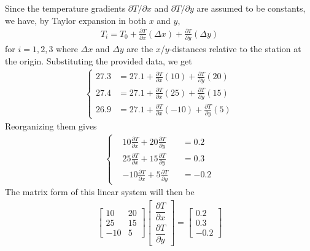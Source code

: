 \begin{solution}
Since the temperature gradients $\partial T/\partial x$ and $\partial T/\partial y$ are assumed to be constants, we have, by Taylor expansion in both $x$ and $y$,
\begin{align*}
T_i = T_0 + \frac{\partial T}{\partial x}(\Delta x) + \frac{\partial T}{\partial y}(\Delta y)
\end{align*}
for $i = 1,2,3$ where $\Delta x$ and $\Delta y$ are the $x$/$y$-distances relative to the station at the origin. Substituting the provided data, we get
\begin{align*}
\left\{\begin{alignedat}{2}
27.3 &= 27.1 + \frac{\partial T}{\partial x}(10) + \frac{\partial T}{\partial y}(20) \\ 
27.4 &= 27.1 + \frac{\partial T}{\partial x}(25) + \frac{\partial T}{\partial y}(15) \\
26.9 &= 27.1 + \frac{\partial T}{\partial x}(-10) + \frac{\partial T}{\partial y}(5) 
\end{alignedat}\right.
\end{align*}
Reorganizing them gives
\begin{align}
\left\{\begin{alignedat}{2}
& 10\frac{\partial T}{\partial x} + 20\frac{\partial T}{\partial y}& &= 0.2 \\ 
& 25\frac{\partial T}{\partial x} + 15\frac{\partial T}{\partial y}& &= 0.3 \\
& {-}10\frac{\partial T}{\partial x} + 5\frac{\partial T}{\partial y}& &= -0.2
\end{alignedat}\right.
\end{align}
The matrix form of this linear system will then be
\begin{align*}
\begin{bmatrix}
10 & 20 \\
25 & 15 \\
-10 & 5
\end{bmatrix}
\begin{bmatrix}
\dfrac{\partial T}{\partial x} \\[10pt]
\dfrac{\partial T}{\partial y} 
\end{bmatrix}
=
\begin{bmatrix}
0.2 \\
0.3 \\
-0.2
\end{bmatrix}
\end{align*}
\end{solution}

